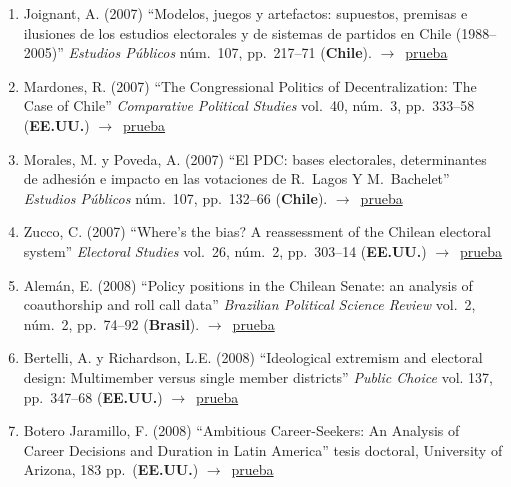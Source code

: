 \documentclass[12 pt, letter]{article}
\newenvironment{CitasMiTrabajo}{
    \begin{footnotesize}
    \begin{enumerate}[label={\footnotesize\emph{cita~\arabic*}},ref=\arabic*] %
        \setlength{\itemsep}{.1\itemsep}
        \setlength{\parskip}{.1\parskip}
    }{\end{enumerate}\end{footnotesize}}
\begin{document}
\begin{CitasMiTrabajo}
        \item Joignant, A. (2007)
        ``Modelos, juegos y artefactos: supuestos, premisas e ilusiones de los estudios electorales y de sistemas de partidos
        en Chile (1988--2005)'' \emph{Estudios P\'ublicos} n\'um.\ 107, pp.\ 217--71  (\textbf{Chile}). $\rightarrow$~\href{http://ericmagar.com/cv/cites/mrs/joignant07.pdf}{prueba}

        \item Mardones, R. (2007)
        ``The Congressional Politics of Decentralization: The Case of Chile'' \emph{Comparative
        Political Studies} vol.\ 40, n\'um.\ 3, pp.\ 333--58  (\textbf{EE.UU.}) $\rightarrow$~\href{http://ericmagar.com/cv/cites/mrs/mardones.pdf}{prueba}

        \item Morales, M. y Poveda, A. (2007)
        ``El PDC: bases electorales, determinantes de adhesi\'on e impacto en las votaciones de R.\ Lagos Y M.\ Bachelet''
        \emph{Estudios P\'ublicos} n\'um.\ 107, pp.\ 132--66  (\textbf{Chile}). $\rightarrow$~\href{http://ericmagar.com/cv/cites/mrs/morales+povedapdcbases.pdf}{prueba}

        \item Zucco, C. (2007)
        ``Where's the bias? A reassessment of the Chilean electoral system'' \emph{Electoral Studies} vol.\ 26, n\'um.\ 2,
        pp.\ 303--14  (\textbf{EE.UU.}) $\rightarrow$~\href{http://ericmagar.com/cv/cites/mrs/zucco.pdf}{prueba}

        \item Alem\'an, E. (2008)
        ``Policy positions in the Chilean Senate: an analysis of coauthorship and roll call data''
        \emph{Brazilian Political Science Review}
        vol.\ 2, n\'um.\ 2, pp.\ 74--92 (\textbf{Brasil}). $\rightarrow$~\href{http://ericmagar.com/cv/cites/mrs/alemanCosponsorChile2008brjps.excerpt.pdf}{prueba}

        \item Bertelli, A. y Richardson, L.E. (2008)
        ``Ideological extremism and electoral design: Multimember versus
        single member districts'' \emph{Public Choice} vol. 137, pp.\
        347--68  (\textbf{EE.UU.}) $\rightarrow$~\href{http://ericmagar.com/cv/cites/mrs/bertelli.pdf}{prueba}

        \item Botero Jaramillo, F. (2008)
        ``Ambitious Career-Seekers: An Analysis of Career Decisions and Duration in Latin America'' tesis doctoral, University of Arizona, 183 pp.\ (\textbf{EE.UU.}) $\rightarrow$~\href{http://ericmagar.com/cv/cites/mrs/Botero2008.pdf}{prueba}


\end{CitasMiTrabajo}
\end{document}
